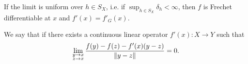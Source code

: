 \begin{definition}
\begin{defenum}
    If the limit is uniform over $h \in S_X$, i.e. if $\sup_{h \in S_X} \delta_h < \infty$, then $f$ is Frechet differentiable at $x$ and $f'(x) = f'_G(x)$.

    \item\label{def:differentiability/strong}\cite[33]{Dontchev2014} We say that  if there exists a continuous linear operator $f'(x): X \to Y$ such that
    \begin{align*}
      \lim_{\substack{y \to x \\ z \to x}} \frac{f(y) - f(z) - f'(x)(y - z)} {\left\Vert y - z \right\Vert} = 0.
    \end{align*}
  \end{defenum}
\end{definition}
